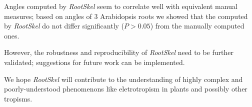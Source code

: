 Angles computed by \textit{RootSkel} seem to correlate well with equivalent manual measures; based on angles of 3 Arabidopsis roots we showed that the computed by \textit{RootSkel} do not differ significantly (\(P >0.05\)) from the manually computed ones. %

However, the robustness and reproducibility of \textit{RootSkel} need to be further validated; suggestions for future work can be implemented. 

We hope \textit{RootSkel} will contribute to the understanding of highly complex and poorly-understood phenomenons like eletrotropism in plants and possibly other tropisms. %

%




